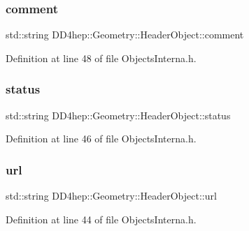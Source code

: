 \subsubsection{\texorpdfstring{comment}{comment}}
{\footnotesize\ttfamily std\+::string D\+D4hep\+::\+Geometry\+::\+Header\+Object\+::comment}



Definition at line 48 of file Objects\+Interna.\+h.

\hypertarget{class_d_d4hep_1_1_geometry_1_1_header_object_a20972a1281cbc8afec103918e9cdae43}{}\label{class_d_d4hep_1_1_geometry_1_1_header_object_a20972a1281cbc8afec103918e9cdae43} 
\subsubsection{\texorpdfstring{status}{status}}
{\footnotesize\ttfamily std\+::string D\+D4hep\+::\+Geometry\+::\+Header\+Object\+::status}



Definition at line 46 of file Objects\+Interna.\+h.

\hypertarget{class_d_d4hep_1_1_geometry_1_1_header_object_a702018d66501a7a062895ca2f481e697}{}\label{class_d_d4hep_1_1_geometry_1_1_header_object_a702018d66501a7a062895ca2f481e697} 
\subsubsection{\texorpdfstring{url}{url}}
{\footnotesize\ttfamily std\+::string D\+D4hep\+::\+Geometry\+::\+Header\+Object\+::url}



Definition at line 44 of file Objects\+Interna.\+h.

\hypertarget{class_d_d4hep_1_1_geometry_1_1_header_object_a9a2b7104b14240b8b884ff0519307204}{}\label{class_d_d4hep_1_1_geometry_1_1_header_object_a9a2b7104b14240b8b884ff0519307204} 
